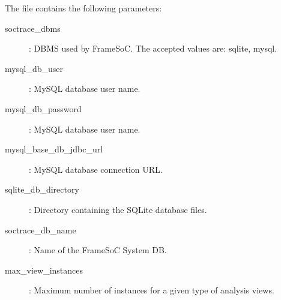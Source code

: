 \documentclass[twoside]{article}
\begin{document}
\begin{sloppypar}
The file contains the following parameters:
\begin{description}
 \item[soctrace\_dbms]: DBMS used by FrameSoC. The accepted values are: sqlite, mysql.
 \item[mysql\_db\_user]: MySQL database user name.
 \item[mysql\_db\_password]: MySQL database user name.
 \item[mysql\_base\_db\_jdbc\_url]: MySQL database connection URL.
 \item[sqlite\_db\_directory]: Directory containing the SQLite database files.
 \item[soctrace\_db\_name]: Name of the FrameSoC System DB.
 \item[max\_view\_instances]: Maximum number of instances for a given type of analysis views.
\end{description}

\newpage
\renewcommand{\refname}{References}
{}


\end{sloppypar} 
\end{document}
